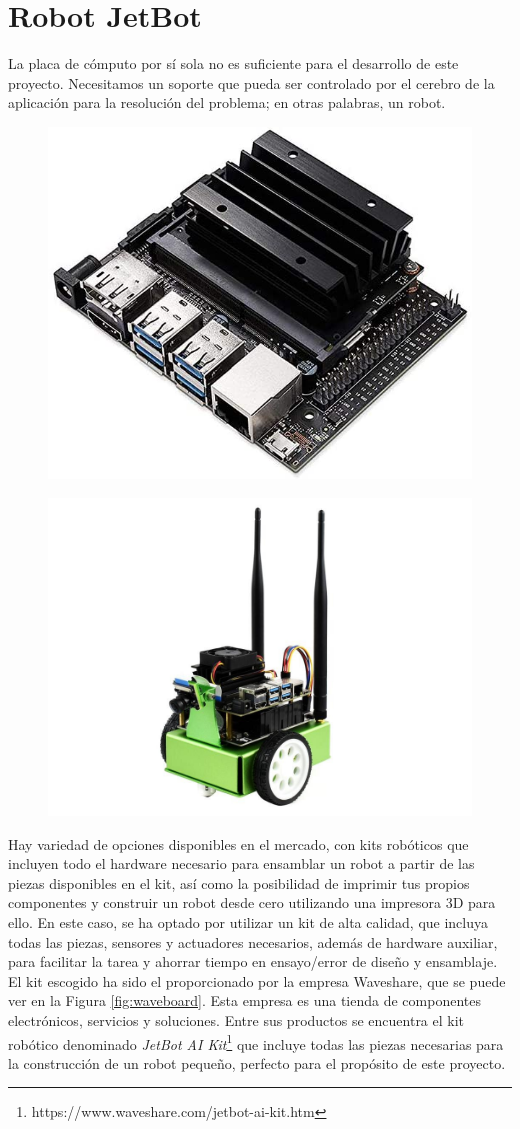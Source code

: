 \section{Robot JetBot}

La placa de cómputo por sí sola no es suficiente para el desarrollo de este proyecto. Necesitamos un soporte que pueda ser controlado por el cerebro de la aplicación para la resolución del problema; en otras palabras, un robot.


\begin{figure}
\centering
\begin{minipage}{.5\textwidth}
  \centering
  \includegraphics[width=.5\linewidth]{img/nanoboard}
  \label{fig:nanoboard}
\end{minipage}%
\begin{minipage}{.5\textwidth}
  \centering
  \includegraphics[width=.6\linewidth]{img/wavebot}
  \label{fig:wavebot}
\end{minipage}
\end{figure}

Hay variedad de opciones disponibles en el mercado, con kits robóticos que incluyen todo el hardware necesario para ensamblar un robot a partir de las piezas disponibles en el kit, así como la posibilidad de imprimir tus propios componentes y construir un robot desde cero utilizando una impresora 3D para ello. En este caso, se ha optado por utilizar un kit de alta calidad, que incluya todas las piezas, sensores y actuadores necesarios, además de hardware auxiliar, para facilitar la tarea y ahorrar tiempo en ensayo/error de diseño y ensamblaje. El kit escogido ha sido el proporcionado por la empresa Waveshare, que se puede ver en la Figura \ref{fig:waveboard}. Esta empresa es una tienda de componentes electrónicos, servicios y soluciones. Entre sus productos se encuentra el kit robótico denominado \textit{JetBot AI Kit}\footnote{https://www.waveshare.com/jetbot-ai-kit.htm} que incluye todas las piezas necesarias para la construcción de un robot pequeño, perfecto para el propósito de este proyecto. 

